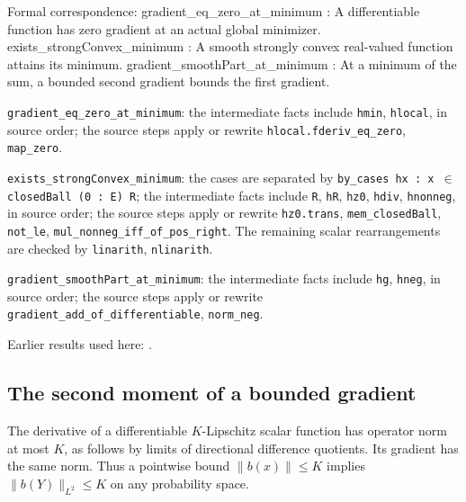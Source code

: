 \documentclass[11pt,a4paper]{report}
\begin{document}
\begin{leanbox}
Formal correspondence: gradient\_eq\_zero\_at\_minimum : A differentiable function has zero gradient at an actual global minimizer. exists\_strongConvex\_minimum : A smooth strongly convex real-valued function attains its minimum. gradient\_smoothPart\_at\_minimum : At a minimum of the sum, a bounded second gradient bounds the first gradient.



\texttt{gradient\_\allowbreak{}eq\_\allowbreak{}zero\_\allowbreak{}at\_\allowbreak{}minimum}: the intermediate facts include \texttt{hmin}, \texttt{hlocal}, in source order; the source steps apply or rewrite \texttt{hlocal.\allowbreak{}fderiv\_\allowbreak{}eq\_\allowbreak{}zero}, \texttt{map\_\allowbreak{}zero}.



\texttt{exists\_\allowbreak{}strong\allowbreak{}Convex\_\allowbreak{}minimum}: the cases are separated by \texttt{by\_\allowbreak{}cases hx : x \ensuremath{\in} closed\allowbreak{}Ball (0 : E) R}; the intermediate facts include \texttt{R}, \texttt{h\allowbreak{}R}, \texttt{hz0}, \texttt{hdiv}, \texttt{hnonneg}, in source order; the source steps apply or rewrite \texttt{hz0.\allowbreak{}trans}, \texttt{mem\_\allowbreak{}closed\allowbreak{}Ball}, \texttt{not\_\allowbreak{}le}, \texttt{mul\_\allowbreak{}nonneg\_\allowbreak{}iff\_\allowbreak{}of\_\allowbreak{}pos\_\allowbreak{}right}. The remaining scalar rearrangements are checked by \texttt{linarith}, \texttt{nlinarith}.



\texttt{gradient\_\allowbreak{}smooth\allowbreak{}Part\_\allowbreak{}at\_\allowbreak{}minimum}: the intermediate facts include \texttt{hg}, \texttt{hneg}, in source order; the source steps apply or rewrite \texttt{gradient\_\allowbreak{}add\_\allowbreak{}of\_\allowbreak{}differentiable}, \texttt{norm\_\allowbreak{}neg}.
\end{leanbox}


Earlier results used here: \cite[Section~3.26.5]{LangevinLean2026ULASC}.
\subsection{\texorpdfstring{The second moment of a bounded gradient}{The second moment of a bounded gradient}}
\label{report-step-ProximalLangevin-SplittingMoments-lean-3}


The derivative of a differentiable \(K\)-Lipschitz scalar function has operator norm at most \(K\), as follows by limits of directional difference quotients. Its gradient has the same norm. Thus a pointwise bound \(\|b(x)\|\le K\) implies \(\|b(Y)\|_{L^2}\le K\) on any probability space.
\end{document}
